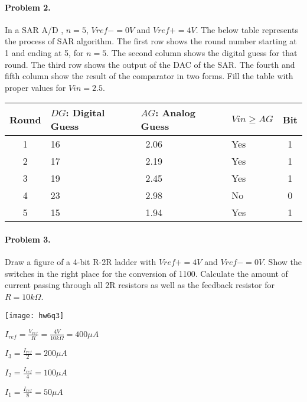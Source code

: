 \documentclass[12pt,letterpaper,titlepage]{article}
\begin{document}
\begin{raggedright}
\paragraph{Problem 2. }
In a SAR A/D , $n = 5$, $Vref- = 0V$ and $Vref+ = 4V$. The below table represents the process of SAR algorithm. The first row shows the round number starting at 1 and ending at 5, for $n = 5$. The second column shows the digital guess for that round. The third row shows the output of the DAC of the SAR. The fourth and fifth column show the result of the comparator in two forms. Fill the table with proper values for $Vin = 2.5$.
\begin{table}[ht]
\centering
\begin{tabular}{|c|l|l|l|c|}
\hline 
Round & $DG$: Digital Guess & $AG$: Analog Guess & $Vin \geq AG$ & Bit \\\hline 
1     & 16                  & ~2.06              & Yes           & 1   \\\hline 
2     & 17                  & ~2.19              & Yes           & 1   \\\hline 
3     & 19                  & ~2.45              & Yes           & 1   \\\hline 
4     & 23                  & ~2.98              & No            & 0   \\\hline 
5     & 15                  & ~1.94              & Yes           & 1   \\\hline 
\end{tabular} 
\end{table}

\paragraph{Problem 3. }
Draw a figure of a 4-bit R-2R ladder with $Vref+ = 4V$ and $Vref- = 0V$. Show the switches in the right place for the conversion of 1100. Calculate the amount of current passing through all 2R resistors as well as the feedback resistor for $R = 10 k\Omega$.
\begin{center}
\texttt{[image: hw6q3]}
\end{center}

$I_{ref} = \frac{V_{ref}}{R} = \frac{4V}{10k\Omega} = 400\mu A$

$I_3 = \frac{I_{ref}}{2} = 200\mu A$

$I_2 = \frac{I_{ref}}{4} = 100\mu A$

$I_1 = \frac{I_{ref}}{8} = 50\mu A$


\end{raggedright}
\end{document}
